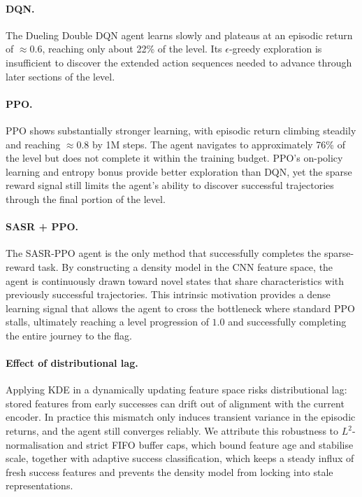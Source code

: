 \documentclass{article}
\begin{document}
\paragraph{DQN.} The Dueling Double DQN agent learns slowly and plateaus at an episodic return of $\approx0.6$, reaching only about 22\% of the level. Its $\epsilon$-greedy exploration is insufficient to discover the extended action sequences needed to advance through later sections of the level.

\paragraph{PPO.} PPO shows substantially stronger learning, with episodic return climbing steadily and reaching $\approx0.8$ by 1M steps. The agent navigates to approximately 76\% of the level but does not complete it within the training budget. PPO's on-policy learning and entropy bonus provide better exploration than DQN, yet the sparse reward signal still limits the agent's ability to discover successful trajectories through the final portion of the level.

\paragraph{SASR + PPO.} The SASR-PPO agent is the only method that successfully completes the sparse-reward task. By constructing a density model in the CNN feature space, the agent is continuously drawn toward novel states that share characteristics with previously successful trajectories. This intrinsic motivation provides a dense learning signal that allows the agent to cross the bottleneck where standard PPO stalls, ultimately reaching a level progression of $1.0$ and successfully completing the entire journey to the flag.

\paragraph{Effect of distributional lag.} Applying KDE in a dynamically updating feature space risks distributional lag: stored features from early successes can drift out of alignment with the current encoder. In practice this mismatch only induces transient variance in the episodic returns, and the agent still converges reliably. We attribute this robustness to $L^2$-normalisation and strict FIFO buffer caps, which bound feature age and stabilise scale, together with adaptive success classification, which keeps a steady influx of fresh success features and prevents the density model from locking into stale representations.
\end{document}
